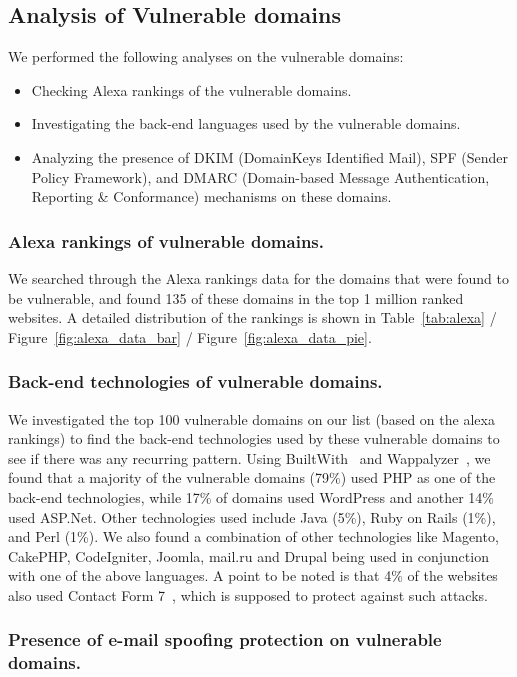 \subsection{Analysis of Vulnerable domains}

We performed the following analyses on the vulnerable domains:
\begin{itemize}
	\item Checking Alexa rankings of the vulnerable domains.
	\item Investigating the back-end languages used by the vulnerable domains.
	\item Analyzing the presence of DKIM (DomainKeys Identified Mail), SPF (Sender Policy Framework), and DMARC (Domain-based Message Authentication, Reporting \& Conformance) mechanisms on these domains.
\end{itemize}


\subsubsection{Alexa rankings of vulnerable domains.}
We searched through the Alexa rankings data\cite{alexa} for the domains that were found to be vulnerable, and found 135 of these domains in the top 1 million ranked websites. A detailed distribution of the rankings is shown in Table~\ref{tab:alexa} / Figure~\ref{fig:alexa_data_bar} / Figure~\ref{fig:alexa_data_pie}.




\subsubsection{Back-end technologies of vulnerable domains.}
We investigated the top 100 vulnerable domains on our list (based on the alexa rankings) to find the back-end technologies used by these vulnerable domains to see if there was any recurring pattern. Using BuiltWith~\cite{builtwith} and Wappalyzer~\cite{wappalyzer}, we found that a majority of the vulnerable domains (79\%) used PHP as one of the back-end technologies, while 17\% of domains used WordPress and another 14\% used ASP.Net. Other technologies used include Java (5\%), Ruby on Rails (1\%), and Perl (1\%). We also found a combination of other technologies like Magento, CakePHP, CodeIgniter, Joomla, mail.ru and Drupal being used in conjunction with one of the above languages. A point to be noted is that 4\% of the websites also used Contact Form 7~\cite{CF7}, which is supposed to protect against such attacks.



\subsubsection{Presence of e-mail spoofing protection on vulnerable domains.}